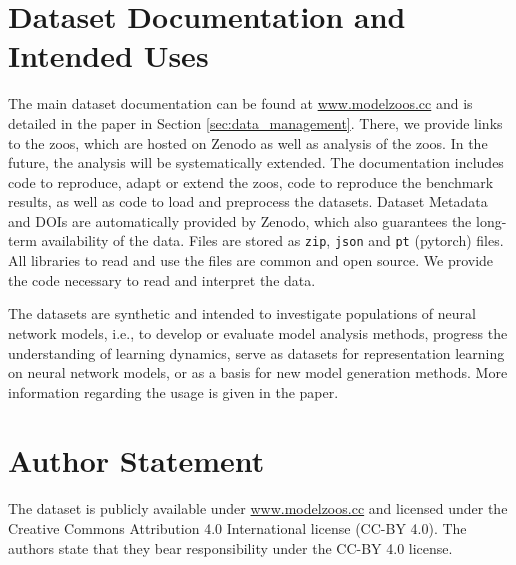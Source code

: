 \newpage
\section{Dataset Documentation and Intended Uses}
The main dataset documentation can be found at \href{www.modelzoos.cc}{www.modelzoos.cc} and is detailed in the paper in Section \ref{sec:data_management}. 
There, we provide links to the zoos, which are hosted on Zenodo as well as analysis of the zoos. In the future, the analysis will be systematically extended. 
The documentation includes code to reproduce, adapt or extend the zoos, code to reproduce the benchmark results, as well as code to load and preprocess the datasets.
Dataset Metadata and DOIs are automatically provided by Zenodo, which also guarantees the long-term availability of the data. 
Files are stored as \texttt{zip}, \texttt{json} and \texttt{pt} (pytorch) files. All libraries to read and use the files are common and open source. We provide the code necessary to read and interpret the data.

The datasets are synthetic and intended to investigate populations of neural network models, i.e., to develop or evaluate model analysis methods, progress the understanding of learning dynamics, serve as datasets for representation learning on neural network models, or as a basis for new model generation methods. More information regarding the usage is given in the paper.


\section{Author Statement}
The dataset is publicly available under \href{www.modelzoos.cc}{www.modelzoos.cc} and licensed under the Creative Commons Attribution 4.0 International license (CC-BY 4.0).
The authors state that they bear responsibility under the CC-BY 4.0 license.

